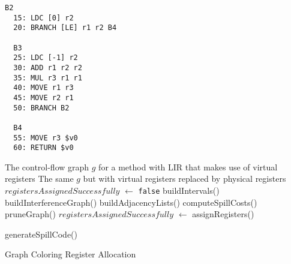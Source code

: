 \documentclass[8pt,a4paper,compress]{beamer}
\begin{document}
\begin{frame}[fragile]
\pause

\begin{lstlisting}[language={},style=focusin]
  B2
  15: LDC [0] r2
  20: BRANCH [LE] r1 r2 B4

  B3
  25: LDC [-1] r2
  30: ADD r1 r2 r2
  35: MUL r3 r1 r1
  40: MOVE r1 r3
  45: MOVE r2 r1
  50: BRANCH B2

  B4
  55: MOVE r3 $v0                                                               
  60: RETURN $v0
\end{lstlisting}
\end{frame}

\begin{frame}[fragile]
\pause

\begin{algorithm}[H]
\begin{algorithmic}
\REQUIRE The control-flow graph $g$ for a method with LIR that makes use of virtual registers
\ENSURE The same $g$ but with virtual registers replaced by physical registers
\STATE $registersAssignedSuccessfully$ $\gets$ \lstinline{false}
\REPEAT
    \REPEAT
        \STATE buildIntervals()
        \STATE buildInterferenceGraph()
        \STATE buildAdjacencyLists()
        \STATE computeSpillCosts()
	\STATE pruneGraph()
        \STATE $registersAssignedSuccessfully$ $\gets$ assignRegisters()

            \STATE generateSpillCode()
        \ENDIF
{}
\end{algorithmic}
\caption{Graph Coloring Register Allocation}
\end{algorithm}
\end{frame}
\end{document}
